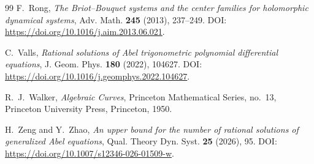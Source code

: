 \documentclass[12pt,a4paper]{amsart}
\numberwithin{theorem}{section}
\theoremstyle{definition}
\begin{document}
\begin{thebibliography}{99}
		F.~Rong, 
		\newblock \emph{The Briot--Bouquet systems and the center families for holomorphic dynamical systems}, 
		\newblock Adv. Math. \textbf{245} (2013), 237--249. 
		\newblock DOI: \url{https://doi.org/10.1016/j.aim.2013.06.021}.
		
		C.~Valls,
		\newblock \emph{Rational solutions of Abel trigonometric polynomial differential equations},
		\newblock J. Geom. Phys. \textbf{180} (2022), 104627.
		\newblock DOI: \url{https://doi.org/10.1016/j.geomphys.2022.104627}.
		
		R.~J.~Walker,
		\newblock \emph{Algebraic Curves},
		\newblock Princeton Mathematical Series, no.~13,
		Princeton University Press, Princeton, 1950.
		
		H.~Zeng and Y.~Zhao,
		\newblock \emph{An upper bound for the number of rational solutions of generalized Abel equations},
		\newblock Qual. Theory Dyn. Syst. \textbf{25} (2026), 95.
		\newblock DOI: \url{https://doi.org/10.1007/s12346-026-01509-w}.
		
	\end{thebibliography}
	
\end{document}
